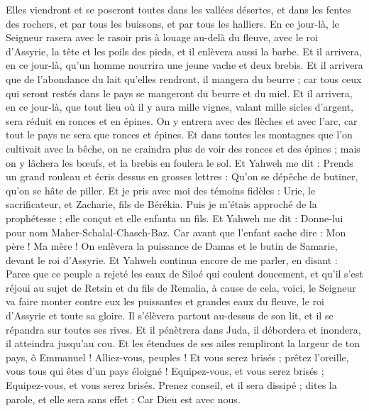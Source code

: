\begin{multicols}{2}
Elles viendront et se poseront toutes dans les vallées désertes, et dans les fentes des rochers, et par tous les buissons, et par tous les halliers.
En ce jour-là, le Seigneur rasera avec le rasoir pris à louage au-delà du fleuve, avec le roi d'Assyrie, la tête et les poils des pieds, et il enlèvera aussi la barbe.
Et il arrivera, en ce jour-là, qu'un homme nourrira une jeune vache et deux brebis.
Et il arrivera que de l'abondance du lait qu'elles rendront, il mangera du beurre ; car tous ceux qui seront restés dans le pays se mangeront du beurre et du miel.
Et il arrivera, en ce jour-là, que tout lieu où il y aura mille vignes, valant mille sicles d'argent, sera réduit en ronces et en épines.
On y entrera avec des flèches et avec l'arc, car tout le pays ne sera que ronces et épines.
Et dans toutes les montagnes que l'on cultivait avec la bêche, on ne craindra plus de voir des ronces et des épines ; mais on y lâchera les bœufs, et la brebis en foulera le sol.
\VerseOne{}Et Yahweh me dit : Prends un grand rouleau et écris dessus en grosses lettres : Qu'on se dépêche de butiner, qu'on se hâte de piller.
Et je pris avec moi des témoins fidèles : Urie, le sacrificateur, et Zacharie, fils de Bérékia.
Puis je m'étais approché de la prophétesse ; elle conçut et elle enfanta un fils. Et Yahweh me dit : Donne-lui pour nom Maher-Schalal-Chasch-Baz.
Car avant que l'enfant sache dire : Mon père ! Ma mère ! On enlèvera la puissance de Damas et le butin de Samarie, devant le roi d'Assyrie.
Et Yahweh continua encore de me parler, en disant :
Parce que ce peuple a rejeté les eaux de Siloé qui coulent doucement, et qu'il s'est réjoui au sujet de Retsin et du fils de Remalia,
à cause de cela, voici, le Seigneur va faire monter contre eux les puissantes et grandes eaux du fleuve, le roi d'Assyrie et toute sa gloire. Il s'élèvera partout au-dessus de son lit, et il se répandra sur toutes ses rives.
Et il pénètrera dans Juda, il débordera et inondera, il atteindra jusqu'au cou. Et les étendues de ses ailes rempliront la largeur de ton pays, ô Emmanuel !
Alliez-vous, peuples ! Et vous serez brisés ; prêtez l'oreille, vous tous qui êtes d'un pays éloigné ! Equipez-vous, et vous serez brisés ; Equipez-vous, et vous serez brisés.
Prenez conseil, et il sera dissipé ; dites la parole, et elle sera sans effet : Car Dieu est avec nous.

\end{multicols}
